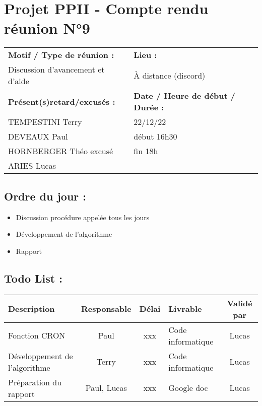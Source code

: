 \documentclass{article}
\begin{document}
\section*{Projet PPII - Compte rendu réunion N°9}
\begin{tabular}{|p{7cm}|p{6cm}|}
    \hline
    \textbf{Motif / Type de réunion :}
    & \textbf{Lieu :}
    \\
    Discussion d'avancement et d'aide
    & 
    À distance (discord)
    \\ \hline
    \textbf{Présent(s)retard/excusés :}
    &
    \textbf{Date / Heure de début / Durée :}
    \\ 
    TEMPESTINI Terry &  22/12/22\\  
    DEVEAUX Paul & début 16h30\\
    HORNBERGER Théo excusé & fin 18h\\
    ARIES Lucas & 
    \\ \hline
\end{tabular}

\subsection*{Ordre du jour :}
\begin{itemize}
    \item{Discussion procédure appelée tous les jours}
    \item{Développement de l'algorithme}
    \item{Rapport}
\end{itemize}

\subsection*{Todo List :}
\begin{tabular}{|p{3.5cm}|c|c|p{4.5cm}|c|}
    \hline 
    Description & Responsable & Délai & Livrable & Validé par 
    \\ \hline
    Fonction CRON & Paul & xxx & Code informatique& Lucas \\ \hline
    Développement de l'algorithme & Terry & xxx & Code informatique & Lucas \\ \hline
    Préparation du rapport & Paul, Lucas & xxx & Google doc & Lucas \\ \hline
    
\end{tabular}
\end{document}
